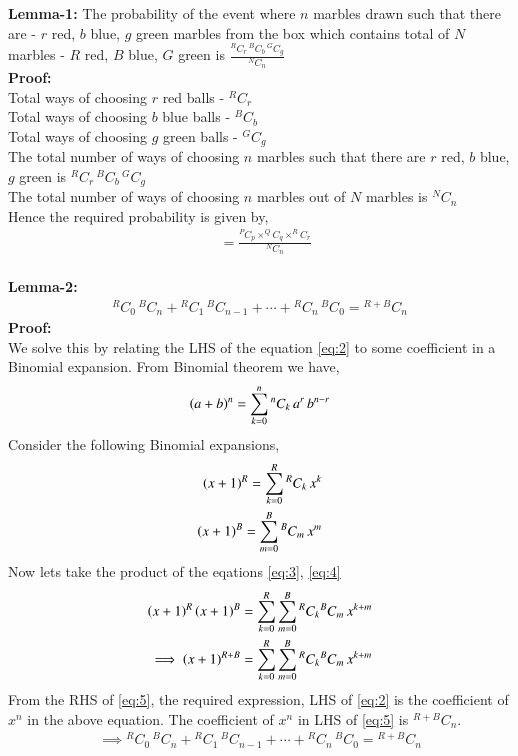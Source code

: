 \documentclass[journal,12pt,twocolumn]{IEEEtran}
\begin{document}
\begin{enumerate}
\textbf{Lemma-1:}
The probability of the event where $n$ marbles drawn such that there are - $r$ red, $b$ blue, $g$ green marbles from the box which contains total of $N$ marbles - $R$ red, $B$ blue, $G$ green is $\frac{^{R}C_{r} \, ^{B}C_{b} \, ^{G}C_{g}}{^{N}C_{n}}$\\
\textbf{Proof:} \\
Total ways of choosing $r$ red balls - $^{R}C_{r}$\\
Total ways of choosing $b$ blue balls - $^{B}C_{b}$\\
Total ways of choosing $g$ green balls - $^{G}C_{g}$\\
The total number of ways of choosing $n$ marbles such that there are $r$ red, $b$ blue, $g$ green is $^{R}C_{r} \, ^{B}C_{b} \, ^{G}C_{g}$\\
The total number of ways of choosing $n$ marbles out of $N$ marbles is $^{N}C_{n}$\\
Hence the required probability is given by,
\begin{align}
&= \frac{^{P}C_{p} \times ^{Q}C_{q} \times ^{R}C_{r}}{^{N}C_{n}}
\label{eq:1}
\end{align}
\\
\textbf{Lemma-2:} 
\begin{align}
{^{R}C_{0}} \, {^{B}C_{n}} + {^{R}C_{1}} \, {^{B}C_{n-1}} + \cdots + {^{R}C_{n}} \, {^{B}C_{0}} = {^{R+B}C_{n}} \label{eq:2}
\end{align}
\textbf{Proof:} \\
We solve this by relating the LHS of the equation \eqref{eq:2} to some coefficient in a Binomial expansion. From Binomial theorem we have,
\begin{align}
\left(a+b\right)^n = \sum_{k = 0}^{n} {^{n}C_{k}} \, a^r \, b^{n-r}
\end{align}
Consider the following Binomial expansions,
\begin{align}
\left(x+1\right)^R = \sum_{k = 0}^{R} {^{R}C_{k}} \, x^k \label{eq:3}\\
\left(x+1\right)^B = \sum_{m = 0}^{B} {^{B}C_{m}} \, x^m \label{eq:4}
\end{align}
Now lets take the product of the eqations \eqref{eq:3}, \eqref{eq:4}
\begin{align}
\left(x+1\right)^R \left(x+1\right)^B = \sum_{k = 0}^{R} \sum_{m = 0}^{B} {^{R}C_{k}} {^{B}C_{m}}\, x^{k+m}\\
\implies \left(x+1\right)^{R+B} = \sum_{k = 0}^{R} \sum_{m = 0}^{B} {^{R}C_{k}} {^{B}C_{m}}\, x^{k+m} \label{eq:5}
\end{align} 
From the RHS of \eqref{eq:5}, the required expression, LHS of \eqref{eq:2} is the coefficient of $x^{n}$ in the above equation. The coefficient of $x^{n}$ in LHS of \eqref{eq:5} is ${^{R+B}C_{n}}$. 
\begin{align}
\implies {^{R}C_{0}} \, {^{B}C_{n}} + {^{R}C_{1}} \, {^{B}C_{n-1}} + \cdots + {^{R}C_{n}} \, {^{B}C_{0}} = {^{R+B}C_{n}} 
\end{align}



\end{enumerate}
\end{document}
